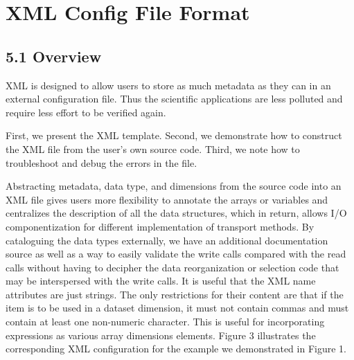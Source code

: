 \vspace{10pt}
\section{XML Config File Format}

\vspace{24pt}
\subsection*{{\large 5.1 }{\large \textbf{ \label{HToc84890241}\label{HToc212016617}\label{HToc212016859}\label{HToc182553364}Overview}}}

\vspace{10pt}
\leftskip=0pt
XML is designed to allow users to store as much metadata as they can in an external 
configuration file. Thus the scientific applications are less polluted and require 
less effort to be verified again.

\vspace{10pt}
First, we present the XML template. Second, we demonstrate how to construct the 
XML file from the user's own source code. Third, we note how to troubleshoot and 
debug the errors in the file.  

\vspace{10pt}
Abstracting metadata, data type, and dimensions from the source code into an XML 
file gives users more flexibility to annotate the arrays or variables and centralizes 
the description of all the data structures, which in return, allows I/O componentization 
for different implementation of transport methods. By cataloguing the data types 
externally, we have an additional documentation source as well as a way to easily 
validate the write calls compared with the read calls without having to decipher 
the data reorganization or selection code that may be interspersed with the write 
calls. It is useful that the XML name attributes are just strings. The only restrictions 
for their content are that if the item is to be used in a dataset dimension, it 
must not contain commas and must contain at least one non-numeric character. This 
is useful for incorporating expressions as various array dimensions elements. Figure 
3 illustrates the corresponding XML configuration for the example we demonstrated 
in Figure 1. 

